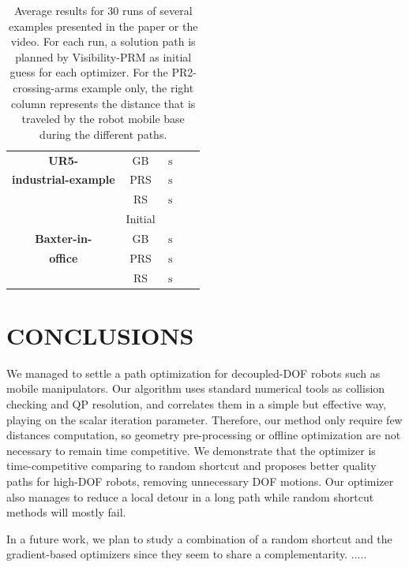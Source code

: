 \documentclass{tADR2e}
\begin{document}
\begin{table}
{\begin{tabular}{ccccc}
    \textbf{UR5-} & GB & $\,\text{s}$ & $ $ &\\
    \textbf{industrial-example} & PRS & $\,\text{s}$ & $  $ &\\
    & RS &  $\,\text{s}$ & $ $ &\\
    \midrule
    & Initial &  & $ $ &\\
    \textbf{Baxter-in-} & GB & $\,\text{s}$ & $ $ &\\
    \textbf{office} & PRS & $\,\text{s}$ & $ $ &\\
    & RS & $\,\text{s}$ & $ $ &\\
    \bottomrule
  \end{tabular}
  }%
\caption{Average results for 30 runs of several examples presented in the paper or 
the video. For each run, a solution path is planned by Visibility-PRM as initial 
guess for each optimizer.
For the PR2-crossing-arms example only, the right column represents the 
distance that is traveled by the robot mobile base during the different paths.
}
\label{tab:results}
\end{table}



\section{CONCLUSIONS}
We managed to settle a path optimization for decoupled-DOF robots such as mobile 
manipulators. Our algorithm uses standard numerical tools as collision checking 
and QP resolution, and correlates them in a 
simple but effective way, playing on the scalar iteration parameter. Therefore, 
our method only require few distances computation, so geometry pre-processing or 
offline optimization are not necessary to remain time competitive. We demonstrate 
that the optimizer is 
time-competitive comparing to random shortcut and proposes better quality paths 
for high-DOF robots, removing unnecessary DOF motions. Our optimizer also manages 
to reduce a local detour in a long path while random shortcut methods will mostly 
fail.

In a future work, we plan to study a combination of a random shortcut and the gradient-based optimizers since they seem to share a complementarity. .....


\end{document}
